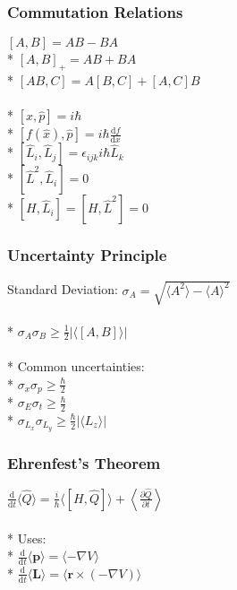 \subsubsection{Commutation Relations}
\([A,B]=AB-BA\)\\*
\([A,B]_+=AB+BA\)\\*
\([AB,C]=A[B,C]+[A,C]B\)\\\\*
\([\hat{x},\hat{p}]=i\hbar\)\\*
\(\displaystyle [f(\hat{x}),\hat{p}]=i\hbar\frac{\mathrm{d}f}{\mathrm{d}x}\)\\*
\([\hat{L}_i,\hat{L}_j]=\epsilon_{ijk}i\hbar\hat{L}_k\)\\*
\([\hat{L}^2,\hat{L}_i]=0\)\\*
\([H,\hat{L}_i]=[H,\hat{L}^2]=0\)

\subsubsection{Uncertainty Principle}
Standard Deviation: \(\sigma_A=\sqrt{\langle A^2\rangle-\langle A\rangle^2}\)\\\\*
\(\sigma_A\sigma_B \geq \frac{1}{2}|\langle[A,B]\rangle|\)\\\\*
Common uncertainties:\\*
\(\sigma_x\sigma_p\geq\frac{\hbar}{2}\)\\*
\(\sigma_E\sigma_t\geq\frac{\hbar}{2}\)\\*
\(\sigma_{L_x}\sigma_{L_y}\geq\frac{\hbar}{2}|\langle L_z\rangle|\)

\subsubsection{Ehrenfest's Theorem}
\(\displaystyle \frac{\mathrm{d}}{\mathrm{d}t}\langle\hat{Q}\rangle=\frac{i}{\hbar}\langle[H,\hat{Q}]\rangle+\left<\frac{\partial \hat{Q}}{\partial t}\right>\)\\\\*
Uses:\\*
\(\displaystyle \frac{\mathrm{d}}{\mathrm{d}t}\langle\mathbf{p}\rangle=\langle-\nabla V\rangle\)\\*
\(\displaystyle \frac{\mathrm{d}}{\mathrm{d}t}\langle\mathbf{L}\rangle=\langle\mathbf{r}\times(-\nabla V)\rangle\)
\newpage
